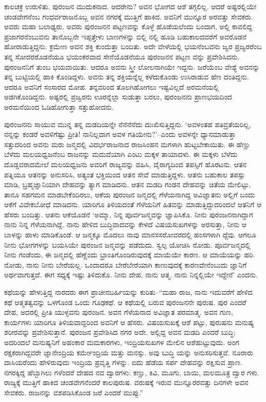 ಕಾಲಚಕ್ರ ಉರುಳಿತು. ಪುರಂಜನ ಮುದುಕನಾದ. ಆದರೇನು? ಅವನ ಭೋಗದ ಆಶೆ ತಗ್ಗಲಿಲ್ಲ. ಆದರೆ ಅಷ್ಟರಲ್ಲಿಯೇ ಚಂಡವೇಗನೆಂಬ ಗಂಧರ್ವರಾಜನೊಬ್ಬ ಅವನ ನಗರಕ್ಕೆ ಮುತ್ತಿಗೆ ಹಾಕಿದ. ಅವನಿಗೆ ಮುನ್ನೂರ ಅರವತ್ತು ಸೇವಕರು. ಅವರು ಮಹಾ ಬಲಾಢ್ಯರು. ಅವರು ಪುರಂಜನನ ಪಟ್ಟಣವನ್ನು ಕೊಳ್ಳೆ ಹೊಡೆಯಲೆಂದು ಬಂದಾಗ, ಅಲ್ಲಿ ಕಾವಲಿದ್ದ ಪ್ರಜಾಗರನೆಂಬುವನು ತಾನೊಬ್ಬನೇ ಇಪ್ಪತ್ತೇಳು ಬಾಣಗಳನ್ನು ಬಿಲ್ಲಿ ನಲ್ಲಿ ಹೂಡಿ ಬಹುಕಾಲದವರೆಗೆ ಅವರೊಡನೆ ಹೋರಾಡುತ್ತಿದ್ದನು. ಕ್ರಮೇಣ ಅವನ ಶಕ್ತಿ ಕುಂದುತ್ತಾ ಬಂದಿತು. ಅದೇ ವೇಳೆಯಲ್ಲಿ ಭಯನೆಂಬವನು ಜ್ವರ ಪ್ರಜ್ವರರೆಂಬ ತನ್ನ ಸೋದರರೊಡನೆಯೂ ಭಯಂಕರವಾದ ಸೇನೆಯೊಡನೆಯೂ ಪುರಂಜನನ ಪಟ್ಟಣ ವನ್ನು ಪ್ರವೇಶಿಸಿದನು. ಪುರಂಜನನಿಗೆ ತುಂಬ ಭಯವಾಯಿತು. ಆದರೂ ಅವನು ಸ್ತ್ರೀ ಲೋಲನಾಗಿಯೇ ಇದ್ದನು. ಜರೆಯೆಂಬ ವೇಶ್ಯೆ ಅವನನ್ನು ತನ್ನ ಬುಟ್ಟಿಯಲ್ಲಿ ಹಾಕಿ ಕೊಂಡಿದ್ದಳು. ಅವನು ತನ್ನ ಶಕ್ತಿಯನ್ನೆಲ್ಲ ಕಳೆದುಕೊಂಡು ಉಸಿರಾಡುವ ಹೆಣ ದಂತಿದ್ದನು. ಆದರೂ ಅವನಿಗೆ ಸಂಸಾರದ ಮೋಹ. ತನ್ನವರಿಂದ ತೊಲಗಿಹೋಗಲು ಇಷ್ಟವಿಲ್ಲದೆ ಅರಮನೆಯಲ್ಲಿ ಅಡಗಿಕೊಂಡಿದ್ದನು. ಅಷ್ಟರಲ್ಲಿ ಪ್ರಜ್ವರನು ಊರನ್ನೆಲ್ಲಾ ಸುಡುತ್ತಾ ಬರಲು, ಪುರಂಜನನು ಪ್ರಾಣಭಯದಿಂದ ಅರಮನೆಯಿಂದ ಓಡಿಹೋಗುತ್ತಾ ಸತ್ತುಹೋದನು.

ಪುರಂಜನನು ಸಾಯುವ ಮುನ್ನ ತನ್ನ ಮಡದಿಯನ್ನೇ ನೆನೆನೆನೆದು ದುಃಖಿಸುತ್ತಿದ್ದನು. ‘ಅವಳಂತಹ ಪತಿವ್ರತೆಯರಿಲ್ಲ, ನನ್ನನ್ನು ಕಂಡರೆ ಅವಳಿಗೆಷ್ಟು ಪ್ರೀತಿ! ನಾನಿಲ್ಲದಾಗ ಅವಳ ಗತಿಯೇನು?’–ಎಂದು ಅವಳನ್ನೇ ಧ್ಯಾನಮಾಡುತ್ತಾ ಸತ್ತುದರಿಂದ ಅವನು ಮರು ಜನ್ಮದಲ್ಲಿ ವಿದರ್ಭರಾಜನಾದ ರಾಜಸಿಂಹನ ಮಗಳಾಗಿ ಹುಟ್ಟಬೇಕಾಯಿತು. ಈ ಹೆಣ್ಣು ಬೆಳೆದು ಮಲಯಧ್ವಜನೆಂಬ ರಾಜನನ್ನು ಮದುವೆಯಾಗಿ ಎಂಟು ಮಕ್ಕಳ ತಾಯಾದಳು. ಈ ಮಕ್ಕಳು ಬೆಳೆದು ದೊಡ್ಡವರಾದಮೇಲೆ ಮಲಯಧ್ವಜನು ಅವರಿಗೆ ರಾಜ್ಯವನ್ನು ವಹಿಸಿ, ವೈರಾಗ್ಯದಿಂದ ತಪಸ್ಸಿಗೆ ಹೊರಟನು. ಆತನ ಪತ್ನಿಯೂ ಆತನನ್ನು ಅನುಸರಿಸಿ, ಅತ್ಯಂತ ಭಕ್ತಿಯಿಂದ ಆತನ ಸೇವೆ ಮಾಡುತ್ತಿದ್ದಳು. ಆತನು ಬಹುಕಾಲ ತಪಸ್ಸು ಮಾಡಿ, ಬ್ರಹ್ಮಜ್ಞಾನಿಯಾಗಿ ದೇಹವನ್ನು ತ್ಯಾಗ ಮಾಡಿದನು. ಆತನ ಮಡದಿ ಗಂಡನ ದೇಹವನ್ನು ಚಿತೆಯ ಮೇಲಿಟ್ಟು, ತಾನೂ ಸಹಗಮನ ಮಾಡಬೇಕೆಂದಿರಲು, ಆಕೆಯ ಪುರಂಜನ ಜನ್ಮದಲ್ಲಿ ಗೆಳೆಯನಾಗಿದ್ದ ಅವಿಜ್ಞಾತನು ಅಲ್ಲಿಗೆ ಬಂದು ಆಕೆಗೆ ವಿವೇಕಬೋಧೆ ಮಾಡಿದನು. ಯಾರಿಗೂ ತಿಳಿಯದಂತೆ ಗೆಳೆಯನಿಗೆ ಹಿತವನ್ನು ಮಾಡುತ್ತಿದ್ದುದರಿಂದಲೆ ಆತನಿಗೆ ಆ ಹೆಸರು ಬಂದಿತ್ತು. ಆತನು ಆಕೆಯೊಡನೆ ‘ಅಮ್ಮಾ, ನಿನ್ನ ಪೂರ್ವಜನ್ಮವನ್ನು ಜ್ಞಾಪಿಸಿಕೊ. ನೀನು ಪುರಂಜನನಾಗಿದ್ದಾಗ ನಾನು ನಿನ್ನ ಗೆಳೆಯನಾಗಿದ್ದೆ. ನಾನು ಹೇಳಿದ ಬುದ್ಧಿವಾದವನ್ನು ಕೇಳದೆ ವಿಷಯಸುಖಗಳನ್ನು ಅರಸುತ್ತಾ, ನೀನು ಆ ಬಾಳನ್ನು ಹಾಳು ಮಾಡಿಕೊಂಡೆ. ಆ ಜನ್ಮಕ್ಕೂ ಮೊದಲು ನಾವು ಮಾನಸಸರೋವರದಲ್ಲಿ ಹಂಸಗಳಾಗಿ ದ್ದೆವು. ಆಗಲೂ ನೀನು ಭೋಗಗಳನ್ನು ಬಯಸಿಯೇ ಪುರಂಜನ ಜನ್ಮವನ್ನು ಪಡೆದುದು. ಸ್ವಲ್ಪ ಯೋಚಿಸಿ ನೋಡು. ಪೂರ್ವಜನ್ಮದಲ್ಲಿ ನೀನು ಗಂಡೆಂದು, ಈ ಜನ್ಮದಲ್ಲಿ ಹೆಣ್ಣೆಂದು ಭ್ರಾಂತಿಗೊಂಡಿರುವುದಕ್ಕೆ ಮಾಯೆಯೇ ಕಾರಣ. ಆ ಮಾಯೆಯನ್ನು ಹರಿ. ನೋಡು, ನಾನು ನೀನು ಬೇರೆಯಲ್ಲ. ಒಂದಾದರೂ ಬೇರೆಬೇರೆಯಾಗಿ ಕಾಣುವುದಕ್ಕೆ ಕಾರಣವೇನೆಂಬುದು ಜ್ಞಾನಿಗೆ ಅರ್ಥವಾಗುತ್ತದೆ. ಈಗ ಸಧ್ಯಕ್ಕೆ ಇಷ್ಟು ತಿಳಿದುಕೊ. ನೀನು ದೇಹ, ನಾನು ಆತ್ಮ. ನಾನು ನಿನ್ನಲ್ಲಿಯೇ ಇದ್ದೇನೆ’ ಎಂದನು.

ಕಥೆಯನ್ನು ಹೇಳುತ್ತಿದ್ದ ನಾರದರು ಈಗ ಪ್ರಾಚೀನಬರ್ಹಿಯನ್ನು ಕುರಿತು–“ಮಹಾ ರಾಜ, ನಾನು ಇದುವರೆಗೆ ಹೇಳಿದ ಕಥೆ ಆತ್ಮತತ್ವವನ್ನು ಒಳಗೊಂಡ ಒಂದು ಗೂಢಕಥೆ. ಆ ಕಥೆಯಲ್ಲಿ ಬರುವ ಪುರಂಜನನೇ ಪುರುಷ. ಪುರ ಎಂದರೆ ದೇಹ, ಅದರಲ್ಲಿ ಪ್ರೀತಿ ಯುಳ್ಳವನು ಪುರಂಜನ. ಅವನ ಗೆಳೆಯನಾದ ಅವಿಜ್ಞಾತ ಪರಮಾತ್ಮ. ಅವನ ಗುಣ, ಕಾರ್ಯಗಳು ಯಾರಿಗೂ ತಿಳಿಯವಾದ್ದರಿಂದ ಅವನಿಗೆ ಆ ಹೆಸರು. ವಿಷಯಸುಖಕ್ಕೆ ಆಶೆ ಪಟ್ಟು, ಪುರುಷನು ಮನುಷ್ಯ ಶರೀರವನ್ನು ಪ್ರವೇಶಿಸುತ್ತಾನೆ. ಪುರಂಜನ ಪ್ರವೇಶಿಸಿದ ನಗರ ಅದೇ. ಅಲ್ಲಿದ್ದ ಅವನ ಮಡದಿ ಎಂದರೆ ಬುದ್ಧಿ; ಅದರಿಂದಲೆ ಮನುಷ್ಯನಿಗೆ ಅಹಂಕಾರ ಮಮಕಾರಗಳು, ಇಂದ್ರಿಯಸುಖಗಳ ಮೇಲಿನ ಆಶೆಹುಟ್ಟುವುದು. ಅಂಗ ರಕ್ಷಕರಾಗಿದ್ದವರೇ ಜ್ಞಾನೇಂದ್ರಿಯ ಕರ್ಮೇಂದ್ರಿಯ ಮತ್ತು ಮನಸ್ಸು. ಅವು ಬುದ್ಧಿ ಯನ್ನು ಅನುಸರಿಸುತ್ತವೆ. ನೂರಾರು ದಾಸಿಯರೆಂದು ಹೇಳಿರುವುದು ಇಂದ್ರಿಯ ಪ್ರವೃತ್ತಿ ಗಳನ್ನು. ಐದು ಹೆಡೆಯ ಸರ್ಪ ದೇಹವನ್ನು ರಕ್ಷಿಸುವ ಪ್ರಾಣ. ನಗರಕ್ಕಿದ್ದ ಹೆಬ್ಬಾಗಿಲು ಗಳೆಂದರೆ ದೇಹದ ನವ ದ್ವಾರಗಳು: ಕಣ್ಣು, ಕಿವಿ, ಮೂಗು, ಬಾಯಿ, ಮಲಮೂತ್ರ ದ್ವಾರ ಗಳು. ರಾಜ್ಯಕ್ಕೆ ಮುತ್ತಿಗೆ ಹಾಕಿದ ಚಂಡವೇಗನೆಂದರೆ ಕಾಲಪುರುಷ. ವರುಷಕ್ಕೆ ಇರುವ ಮುನ್ನೂರರವತ್ತು ದಿನಗಳೇ ಅವನ ಸೇವಕರು. ರಾಜನನ್ನು ವಶಪಡಿಸಿಕೊಂಡ ಜರೆ ಎಂದರೆ ಮುಪ್ಪು.”


